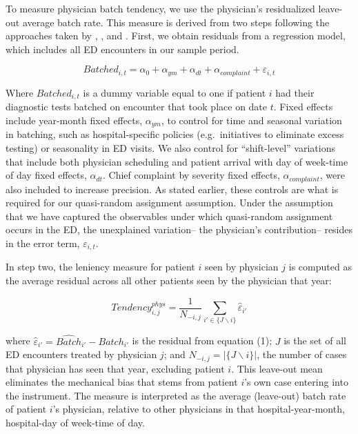 \documentclass[,,nonblindrev]{informs}
\begin{document}
To measure physician batch tendency, we use the physician's residualized
leave-out average batch rate. This measure is derived from two steps
following the approaches taken by \citet{doyle2015measuring},
\citet{dobbie2018effects}, and \citet{eichmeyer2022pathways}. First, we
obtain residuals from a regression model, which includes all ED
encounters in our sample period.

\begin{equation}
Batched_{i,t} = \alpha_0 + \alpha_{ym} + \alpha_{dt} + \alpha_{complaint} + \varepsilon_{i,t}
\end{equation}

Where \(Batched_{i,t}\) is a dummy variable equal to one if patient
\(i\) had their diagnostic tests batched on encounter that took place on
date \(t\). Fixed effects include year-month fixed effects,
\(\alpha_{ym}\), to control for time and seasonal variation in batching,
such as hospital-specific policies (e.g.~initiatives to eliminate excess
testing) or seasonality in ED visits. We also control for
``shift-level'' variations that include both physician scheduling and
patient arrival with day of week-time of day fixed effects,
\(\alpha_{dt}\). Chief complaint by severity fixed effects,
\(\alpha_{complaint}\), were also included to increase precision. As
stated earlier, these controls are what is required for our quasi-random
assignment assumption. Under the assumption that we have captured the
observables under which quasi-random assignment occurs in the ED, the
unexplained variation-- the physician's contribution-- resides in the
error term, \(\varepsilon_{i,t}\).

In step two, the leniency measure for patient \(i\) seen by physician
\(j\) is computed as the average residual across all other patients seen
by the physician that year:

\begin{equation}
Tendency_{i,j}^{phys} =
\frac{1}{N_{-i,j}} \sum_{i' \in \{J \backslash i\}}\hat{\varepsilon}_{i'}
\end{equation}

where \(\hat{\varepsilon}_{i'} = \hat{Batch}_{i'} - Batch_{i'}\) is the
residual from equation (1); \(J\) is the set of all ED encounters
treated by physician \(j\); and \(N_{-i,j} = |\{J \backslash i\}|\), the
number of cases that physician has seen that year, excluding patient
\(i\). This leave-out mean eliminates the mechanical bias that stems
from patient \(i\)'s own case entering into the instrument. The measure
is interpreted as the average (leave-out) batch rate of patient \(i\)'s
physician, relative to other physicians in that hospital-year-month,
hospital-day of week-time of day.
\end{document}
